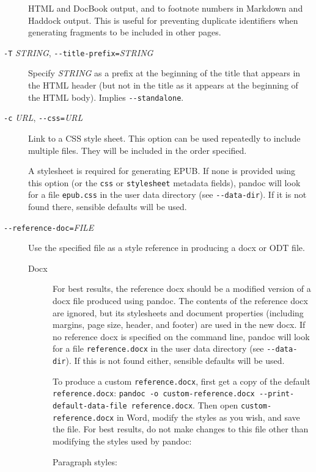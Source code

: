 \documentclass[
]{article}
\begin{document}
\begin{description}
HTML and DocBook output, and to footnote numbers in Markdown and Haddock
output. This is useful for preventing duplicate identifiers when
generating fragments to be included in other pages.
\item[\texttt{-T} \emph{STRING},
\texttt{-\/-title-prefix=}\emph{STRING}]
Specify \emph{STRING} as a prefix at the beginning of the title that
appears in the HTML header (but not in the title as it appears at the
beginning of the HTML body). Implies \texttt{-\/-standalone}.
\item[\texttt{-c} \emph{URL}, \texttt{-\/-css=}\emph{URL}]
Link to a CSS style sheet. This option can be used repeatedly to include
multiple files. They will be included in the order specified.

A stylesheet is required for generating EPUB. If none is provided using
this option (or the \texttt{css} or \texttt{stylesheet} metadata
fields), pandoc will look for a file \texttt{epub.css} in the user data
directory (see \texttt{-\/-data-dir}). If it is not found there,
sensible defaults will be used.
\item[\texttt{-\/-reference-doc=}\emph{FILE}]
Use the specified file as a style reference in producing a docx or ODT
file.

\begin{description}
\item[Docx]
For best results, the reference docx should be a modified version of a
docx file produced using pandoc. The contents of the reference docx are
ignored, but its stylesheets and document properties (including margins,
page size, header, and footer) are used in the new docx. If no reference
docx is specified on the command line, pandoc will look for a file
\texttt{reference.docx} in the user data directory (see
\texttt{-\/-data-dir}). If this is not found either, sensible defaults
will be used.

To produce a custom \texttt{reference.docx}, first get a copy of the
default \texttt{reference.docx}:
\texttt{pandoc\ -o\ custom-reference.docx\ -\/-print-default-data-file\ reference.docx}.
Then open \texttt{custom-reference.docx} in Word, modify the styles as
you wish, and save the file. For best results, do not make changes to
this file other than modifying the styles used by pandoc:

Paragraph styles:


\end{description}
\end{description}
\end{document}
